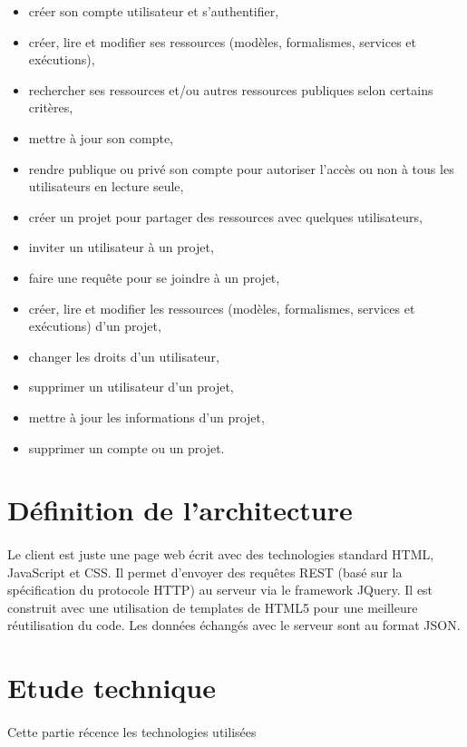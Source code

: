 \documentclass{report}
\begin{document}
\begin{itemize}
\item créer son compte utilisateur et s'authentifier,
\item créer, lire et modifier ses ressources (modèles, formalismes, services et exécutions),
\item rechercher ses ressources et/ou autres ressources publiques selon certains critères,
\item mettre à jour son compte,
\item rendre publique ou privé son compte pour autoriser l'accès ou non à tous les utilisateurs en lecture seule,
\item créer un projet pour partager des ressources avec quelques utilisateurs,
\item inviter un utilisateur à un projet,
\item faire une requête pour se joindre à un projet,
\item créer, lire et modifier les ressources (modèles, formalismes, services et exécutions) d'un projet,
\item changer les droits d'un utilisateur,
\item supprimer un utilisateur d'un projet,
\item mettre à jour les informations d'un projet,
\item supprimer un compte ou un projet.
\end{itemize}

\section{Définition de l'architecture}

\paragraph{}
Le client est juste une page web écrit avec des technologies standard HTML, JavaScript et CSS. Il permet d'envoyer des 
requêtes REST (basé sur la spécification du protocole HTTP) au serveur via le framework JQuery. Il est construit avec une
utilisation de templates de HTML5 pour une meilleure réutilisation du code. Les données échangés avec le serveur sont
au format JSON.

\section{Etude technique}

\paragraph{}
Cette partie récence les technologies utilisées
\end{document}
